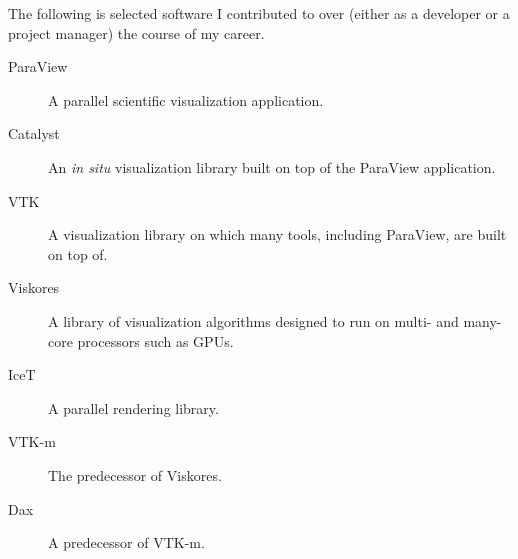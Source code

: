 \documentclass{article}
\begin{document}
The following is selected software I contributed to over (either as a developer or a project manager) the course of my career.

\begin{description}
\item[ParaView] A parallel scientific visualization application.
\item[Catalyst] An \emph{in situ} visualization library built on top of the ParaView application.
\item[VTK] A visualization library on which many tools, including ParaView, are built on top of.
\item[Viskores] A library of visualization algorithms designed to run on multi- and many-core processors such as GPUs.
\item[IceT] A parallel rendering library.
\item[VTK-m] The predecessor of Viskores.
\item[Dax] A predecessor of VTK-m.
\end{description}
\end{document}
